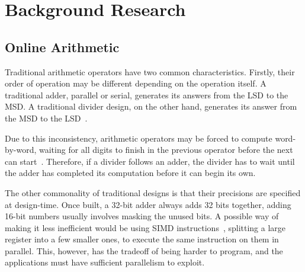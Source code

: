 \section{Background Research}

\subsection{Online Arithmetic}
Traditional arithmetic operators have two common characteristics.
Firstly, their order of operation may be different depending on the operation
itself.
A traditional adder, parallel or serial, generates its answers from the LSD to
the MSD.
A traditional divider design, on the other hand, generates its answer from
the MSD to the LSD~\cite{Brent1}\cite{Srinivas1}.

Due to this inconsistency, arithmetic operators may be forced to compute
word-by-word, waiting for all digits to finish in the previous operator before
the next can start~\cite{Zhao1}.
Therefore, if a divider follows an adder, the divider has to wait until the
adder has completed its computation before it can begin its own.

The other commonality of traditional designs is that their precisions are
specified at design-time.
Once built, a 32-bit adder always adds 32 bits together, adding 16-bit numbers
usually involves masking the unused bits.
A possible way of making it less inefficient would be using SIMD
instructions~\cite{Duncan1}, splitting a large register into a few smaller ones,
to execute the same instruction on them in parallel.
This, however, has the tradeoff of being harder to program, and the applications
must have sufficient parallelism to exploit.

